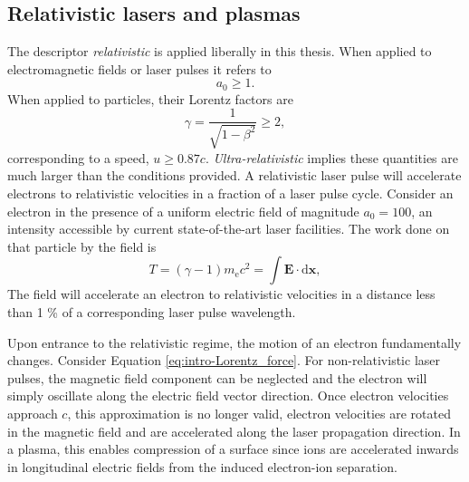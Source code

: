 \subsection{Relativistic lasers and plasmas}
The descriptor \textit{relativistic} is applied liberally in this thesis. When applied to electromagnetic fields or laser pulses it refers to 
\begin{equation}
	a_0 \ge 1.
\end{equation}
When applied to particles, their Lorentz factors are
\begin{equation}
	\gamma = \frac{1}{\sqrt{1-\beta^2}} \ge 2,
\end{equation}
corresponding to a speed, $u \ge 0.87 c$. \textit{Ultra-relativistic} implies these quantities are much larger than the conditions provided. A relativistic laser pulse will accelerate electrons to relativistic velocities in a fraction of a laser pulse cycle. Consider an electron in the presence of a uniform electric field of magnitude $a_0 = 100$, an intensity accessible by current state-of-the-art laser facilities. The work done on that particle by the field is 
\begin{equation}
	T = (\gamma -1)m_\mathrm{e}c^2 = \int \mathbf{E}\cdot \mathrm{d} \mathbf{x},
\end{equation}
The field will accelerate an electron to relativistic velocities in a distance less than 1 \% of a corresponding laser pulse wavelength.

Upon entrance to the relativistic regime, the motion of an electron fundamentally changes. Consider Equation \ref{eq:intro-Lorentz_force}. For non-relativistic laser pulses, the magnetic field component can be neglected and the electron will simply oscillate along the electric field vector direction. Once electron velocities approach $c$, this approximation is no longer valid, electron velocities are rotated in the magnetic field and are accelerated along the laser propagation direction. In a plasma, this enables compression of a surface since ions are accelerated inwards in longitudinal electric fields from the induced electron-ion separation.

